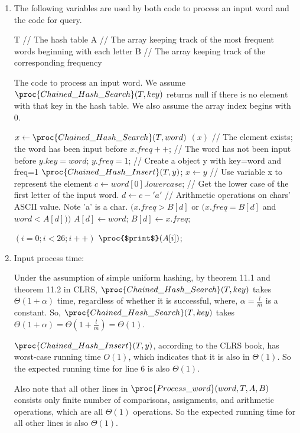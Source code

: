 \documentclass[11pt, answers]{exam}
\theoremstyle{plain}
\theoremstyle{definition}
\begin{document}
\begin{questions}
\begin{solution}
\begin{enumerate}
\item 
The following variables are used by both code to process an input word and the code for query.
\begin{codebox}
\li T // The hash table
\li A // The array keeping track of the most frequent words beginning with each letter
\li B // The array keeping track of the corresponding frequency
\end{codebox}
The code to process an input word.
We assume $\proc{Chained\_Hash\_Search}(T, key)$ returns null if there is no element with that key in the hash table.
We also assume the array index begins with 0.
\begin{codebox}
\li $x \gets \proc{Chained\_Hash\_Search}(T, word)$ 
\li \If $(x)$ // The element exists; the word has been input before
\li 	\Then $x.freq++$; 
\li \Else // The word has not been input before
\li 	$y.key=word$; $y.freq=1$; // Create a object y with key=word and freq=1
\li 	$\proc{Chained\_Hash\_Insert}(T, y)$;
\li 	$x\gets y$ \End // Use variable x to represent the element
\li $c \gets word[0].lowercase$; // Get the lower case of the first letter of the input word.
\li $d \gets c-'a'$ // Arithmetic operations on chars' ASCII value. Note 'a' is a char.
\li \If $(x.freq > B[d]$ or $(x.freq=B[d]$ and $word<A[d]))$ 
\li     \Then $A[d] \gets word$;
\li     $B[d] \gets x.freq$; \End
\end{codebox}

\begin{codebox}
\li \For $(i=0; i<26; i++)$ \Do
\li     $\proc{$print$}(A[i])$;
\end{codebox}

\item
Input process time:

Under the assumption of simple uniform hashing, by theorem 11.1 and theorem 11.2 in CLRS, $\proc{Chained\_Hash\_Search}(T, key)$ takes $\Theta{(1+\alpha)}$ time, regardless of whether it is successful, where, $\alpha=\frac{l}{m}$ is a constant. So, $\proc{Chained\_Hash\_Search}(T, key)$ takes $\Theta{(1+\alpha)}=\Theta{(1+\frac{l}{m})}=\Theta{(1)}$. 

$\proc{Chained\_Hash\_Insert}(T, y)$, according to the CLRS book, has worst-case running time $O(1)$, which indicates that it is also in $\Theta{(1)}$. So the expected running time for line 6 is also $\Theta{(1)}$.

Also note that all other lines in $\proc{Process\_word}(word, T, A, B)$ consists only finite number of comparisons, assignments, and arithmetic operations, which are all $\Theta{(1)}$ operations. So the expected running time for all other lines is also $\Theta{(1)}$.


\end{enumerate}
\end{solution}
\end{questions}
\end{document}

